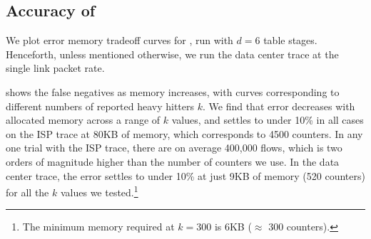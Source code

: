 


\subsection{Accuracy of \TheSystem}
\label{subsec:isolatedEvaluation}

We plot error \vs memory tradeoff curves for \TheSystem, run with $d=6$ table
stages. Henceforth, unless mentioned otherwise, we run the data center trace at
the single link packet rate.

  shows the false negatives as memory
increases, with curves corresponding to different numbers of reported heavy
hitters $k$. We find that error decreases with allocated memory across a range
of $k$ values, and settles to under 10\% in all cases on the ISP trace at 80KB
of memory, which corresponds to 4500 counters. 
%
In any one trial with the ISP trace, there are on average 400,000 flows, which
is two orders of magnitude higher than the number of counters we use.
%
In the data center trace, the error settles to under 10\% at just 9KB of memory
(520 counters) for all the $k$ values we tested.\footnote{The minimum memory
  required at $k=300$ is 6KB ($\approx$ 300 counters).}

